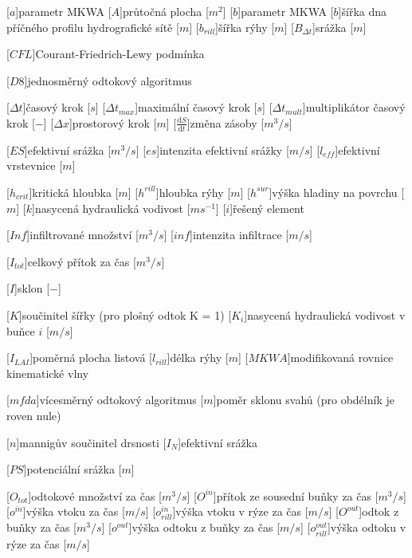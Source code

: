 \begin{acronym}
\setlength{\parskip}{0ex}
\setlength{\itemsep}{1ex}

[$a$]{parametr MKWA}
[$A$]{průtočná plocha  [$m^{2}$]}
[$b$]{parametr MKWA}
[$b$]{šířka dna příčného profilu hydrografické sítě [$m$]}
[$b_{rill}$]{šířka rýhy [$m$]}
[$B_{\Delta t}$]{srážka [$m$]}

[$CFL$]{Courant-Friedrich-Lewy podmínka}


[$D8$]{jednosměrný odtokový algoritmus}

[$\Delta t$]{časový krok [$s$]}
[$\Delta t_{max}$]{maximální časový krok [$s$]}
[$\Delta t_{mult}$]{multiplikátor časový krok [$-$]}
[$\Delta x$]{prostorový krok [$m$]}
[$\frac{\mathrm{d}S}{\mathrm{d}t}$]{změna zásoby [$m^3/s$]}

[$ES$]{efektivní srážka [$m^3/s$]}
[$es$]{intenzita efektivní srážky [$m/s$]}
[$l_{eff}$]{efektivní vrstevnice [$m$]}

[$h_{crit}$]{kritická hloubka [$m$]}
[$h^{rill}$]{hloubka rýhy [$m$]}
[$h^{sur}$]{výška hladiny na povrchu [$m$]}
[$k$]{nasycená hydraulická vodivost [$m s^{-1}$]}
[$i$]{řešený element}

[$Inf$]{infiltrované množství [$m^3/s$]}
[$inf$]{intenzita infiltrace [$m/s$]}

[$I_{tot}$]{celkový přítok za čas [$m^3/s$]}

[$I$]{sklon [$-$]}

[$K$]{součinitel šířky (pro plošný odtok K = 1)}
[$K_i$]{nasycená hydraulická vodivost v buňce $i$ [$m/s$]}

[$I_{LAI}$]{poměrná plocha listová}
[$l_{rill}$]{délka rýhy [$m$]}
[$MKWA$]{modifikovaná rovnice kinematické vlny}

[$mfda$]{vícesměrný odtokový algoritmus}
[$m$]{poměr sklonu svahů (pro obdélník je roven nule)}

[$n$]{mannigův součinitel drsnosti}
[$I_{N}$]{efektivní srážka}

[$PS$]{potenciální srážka [$m$]}

[$O_{tot}$]{odtokové množství za čas [$m^{3}/s$]}
[$O^{in}$]{přítok ze sousední buňky  za čas [$m^{3}/s$]}
[$o^{in}$]{výška vtoku za čas [$m/s$]}
[$o^{in}_{rill}$]{výška vtoku v rýze za čas [$m/s$]}
[$O^{out}$]{odtok z buňky  za čas [$m^{3}/s$]}
[$o^{out}$]{výška odtoku z buňky  za čas [$m/s$]}
[$o^{out}_{rill}$]{výška odtoku v rýze za čas [$m/s$]}



\end{acronym}
